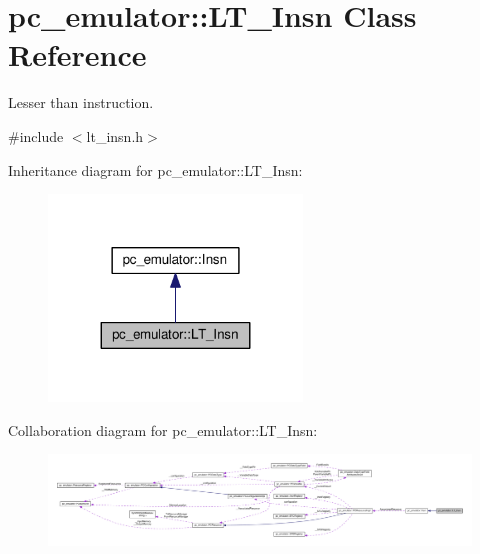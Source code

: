 \hypertarget{classpc__emulator_1_1LT__Insn}{}\section{pc\+\_\+emulator\+:\+:L\+T\+\_\+\+Insn Class Reference}
\label{classpc__emulator_1_1LT__Insn}


Lesser than instruction.  




{\ttfamily \#include $<$lt\+\_\+insn.\+h$>$}



Inheritance diagram for pc\+\_\+emulator\+:\+:L\+T\+\_\+\+Insn\+:\nopagebreak
\begin{figure}[H]
\begin{center}
\leavevmode
\includegraphics[width=191pt]{classpc__emulator_1_1LT__Insn__inherit__graph}
\end{center}
\end{figure}


Collaboration diagram for pc\+\_\+emulator\+:\+:L\+T\+\_\+\+Insn\+:\nopagebreak
\begin{figure}[H]
\begin{center}
\leavevmode
\includegraphics[width=350pt]{classpc__emulator_1_1LT__Insn__coll__graph}
\end{center}
\end{figure}
